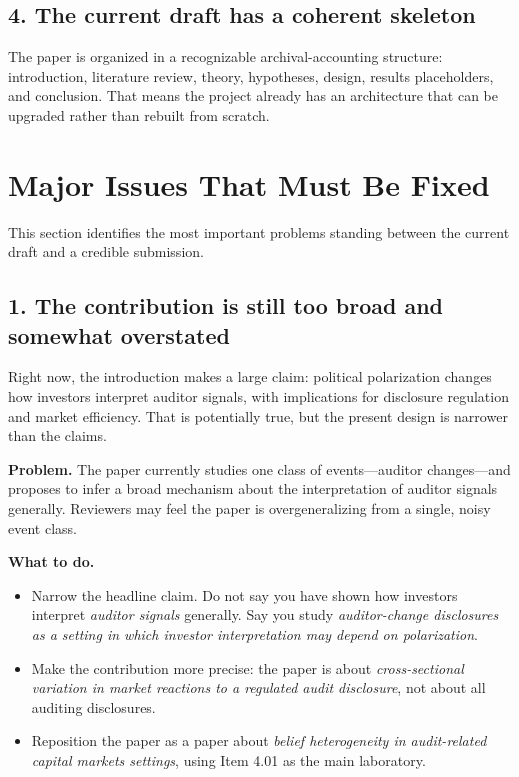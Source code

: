 \documentclass[12pt]{article}
\begin{document}
\subsection*{4. The current draft has a coherent skeleton}
The paper is organized in a recognizable archival-accounting structure: introduction, literature review, theory, hypotheses, design, results placeholders, and conclusion. That means the project already has an architecture that can be upgraded rather than rebuilt from scratch.

\section{Major Issues That Must Be Fixed}
This section identifies the most important problems standing between the current draft and a credible submission.

\subsection{1. The contribution is still too broad and somewhat overstated}
Right now, the introduction makes a large claim: political polarization changes how investors interpret auditor signals, with implications for disclosure regulation and market efficiency. That is potentially true, but the present design is narrower than the claims.

\textbf{Problem.} The paper currently studies one class of events---auditor changes---and proposes to infer a broad mechanism about the interpretation of auditor signals generally. Reviewers may feel the paper is overgeneralizing from a single, noisy event class.

\textbf{What to do.}
\begin{itemize}[leftmargin=2em]
    \item Narrow the headline claim. Do not say you have shown how investors interpret \emph{auditor signals} generally. Say you study \emph{auditor-change disclosures as a setting in which investor interpretation may depend on polarization}.
    \item Make the contribution more precise: the paper is about \emph{cross-sectional variation in market reactions to a regulated audit disclosure}, not about all auditing disclosures.
    \item Reposition the paper as a paper about \emph{belief heterogeneity in audit-related capital markets settings}, using Item 4.01 as the main laboratory.
\end{itemize}
\end{document}
